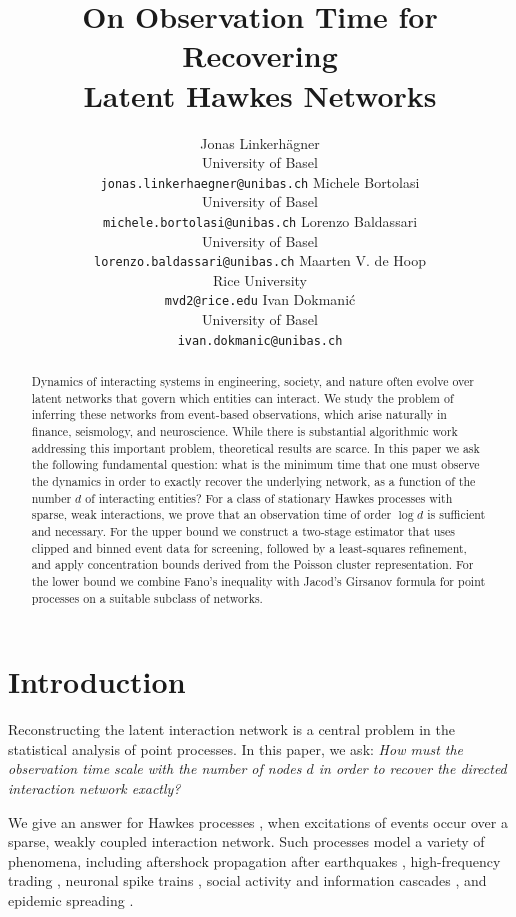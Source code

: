\documentclass{article}
\title{On Observation Time for Recovering \\ Latent Hawkes Networks}
\author{%
  Jonas Linkerhägner \\
  University of Basel\\
  \texttt{jonas.linkerhaegner@unibas.ch} 
  \And
  Michele Bortolasi\\
  University of Basel\\
  \texttt{michele.bortolasi@unibas.ch}
  \And
  Lorenzo Baldassari\\
  University of Basel\\
  \texttt{lorenzo.baldassari@unibas.ch}
  \And
  Maarten V. de Hoop\\
  Rice University \\
  \texttt{mvd2@rice.edu}
  \And
  Ivan Dokmanić\\
  University of Basel\\
  \texttt{ivan.dokmanic@unibas.ch}
}
\begin{document}
\maketitle



\begin{abstract}
Dynamics of interacting systems in engineering, society, and nature often evolve over latent networks that govern which entities can interact. We study the problem of inferring these networks from event-based observations, which arise naturally in finance, seismology, and neuroscience. While there is substantial algorithmic work addressing this important problem, theoretical results are scarce. In this paper we ask the following fundamental question: what is the minimum time that one must observe the dynamics in order to exactly recover the underlying network, as a function of the number $d$ of interacting entities? For a class of stationary Hawkes processes with sparse, weak interactions, we prove that an observation time of order $\log d$ is sufficient and necessary. For the upper bound we construct a two-stage estimator that uses clipped and binned event data for screening, followed by a least-squares refinement, and apply concentration bounds derived from the Poisson cluster representation. For the lower bound we combine Fano’s inequality with Jacod’s Girsanov formula for point processes on a suitable subclass of networks. 

\end{abstract}




\section{Introduction}\label{sec:intro}

Reconstructing the latent interaction network is a central problem in the statistical analysis of point processes.
In this paper, we ask:  
\emph{How must the observation time scale with the number of nodes $d$ in order to recover the directed interaction network exactly?}

We give an answer for Hawkes processes \cite{achab2018uncovering, bacry2020sparse, embrechts2018hawkes}, when excitations of events occur over a sparse, weakly coupled interaction network.
Such processes model a variety of phenomena, including aftershock propagation after earthquakes \cite{ogata1988statistical, zhuang2002stochastic, marsan2008extending}, high-frequency trading \cite{bowsher2007modelling, large2007measuring, bacry2012non}, neuronal spike trains \cite{truccolo2005point, pillow2008spatio}, social activity and information cascades \cite{zhou2013learning, he2015hawkestopic}, and epidemic spreading \cite{chiang2022hawkes}.
\end{document}
